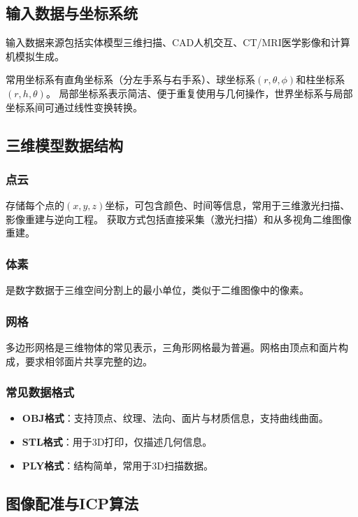 \documentclass[12pt]{article}
\begin{document}
\subsection{输入数据与坐标系统}

输入数据来源包括实体模型三维扫描、CAD人机交互、CT/MRI医学影像和计算机模拟生成。

常用坐标系有直角坐标系（分左手系与右手系）、球坐标系$(r,\theta,\phi)$和柱坐标系$(r,h,\theta)$。
局部坐标系表示简洁、便于重复使用与几何操作，世界坐标系与局部坐标系间可通过线性变换转换。

\subsection{三维模型数据结构}

\subsubsection{点云}
存储每个点的$(x,y,z)$坐标，可包含颜色、时间等信息，常用于三维激光扫描、影像重建与逆向工程。
获取方式包括直接采集（激光扫描）和从多视角二维图像重建。

\subsubsection{体素}
是数字数据于三维空间分割上的最小单位，类似于二维图像中的像素。

\subsubsection{网格}
多边形网格是三维物体的常见表示，三角形网格最为普遍。网格由顶点和面片构成，要求相邻面片共享完整的边。

\subsubsection{常见数据格式}
\begin{itemize}
    \item \textbf{OBJ格式}：支持顶点、纹理、法向、面片与材质信息，支持曲线曲面。
    \item \textbf{STL格式}：用于3D打印，仅描述几何信息。
    \item \textbf{PLY格式}：结构简单，常用于3D扫描数据。
\end{itemize}

\subsection{图像配准与ICP算法}
\end{document}
